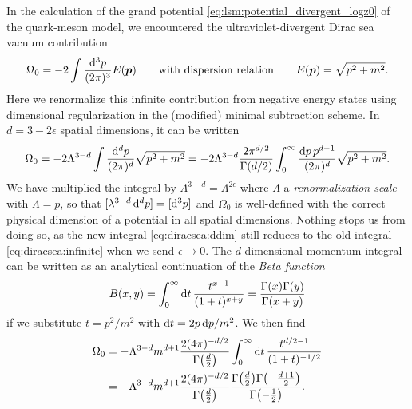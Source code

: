 In the calculation of the grand potential \eqref{eq:lsm:potential_divergent_logz0} of the quark-meson model,
we encountered the ultraviolet-divergent Dirac sea vacuum contribution %
\begin{equation}
	\Omega_0 = -2 \int \frac{\mathop{}\!\mathrm{d}^3 p}{(2 \pi)^3} E({\bm{p}})
	\qquad \text{with dispersion relation} \qquad
	E({\bm{p}}) = \sqrt{p^2+m^2} .
\label{eq:diracsea:infinite}
\end{equation}
Here we renormalize this infinite contribution from negative energy states using dimensional regularization in the (modified) minimal subtraction scheme.
In $d = 3 - 2 \epsilon$ spatial dimensions, it can be written
\begin{equation}
	\Omega_0 = -2 \Lambda^{3-d} \int \frac{\mathop{}\!\mathrm{d}^d p}{(2 \pi)^d} \sqrt{p^2 + m^2}
	         = -2 \Lambda^{3-d} \frac{2 \pi^{d/2}}{\Gamma(d/2)} \int_0^\infty \frac{\mathop{}\!\mathrm{d} p \, p^{d-1}}{(2 \pi)^d} \sqrt{p^2 + m^2} .
\label{eq:diracsea:ddim}
\end{equation}
We have multiplied the integral by $\Lambda^{3-d} = \Lambda^{2\epsilon}$ where $\Lambda$ a \emph{renormalization scale} with $\unit{\Lambda} = \unit{p}$,
so that $[\lambda^{3-d} \mathop{}\!\mathrm{d}^d p] = [\mathop{}\!\mathrm{d}^3 p]$ and $\Omega_0$ is well-defined with the correct physical dimension of a potential in all spatial dimensions.
Nothing stops us from doing so,
as the new integral \eqref{eq:diracsea:ddim} still reduces to the old integral \eqref{eq:diracsea:infinite} when we send $\epsilon \rightarrow 0$.
The $d$-dimensional momentum integral can be written as an analytical continuation of the \emph{Beta function} \cite{ref:beta_function}
\begin{equation}
	B(x,y) = \int_0^\infty \mathop{}\!\mathrm{d} t \, \frac{t^{x-1}}{(1+t)^{x+y}} = \frac{\Gamma(x) \Gamma(y)}{\Gamma(x+y)}
\end{equation}
if we substitute $t = p^2/m^2$ with $\mathop{}\!\mathrm{d} t = 2 p \mathop{}\!\mathrm{d} p / m^2$.
We then find
\begin{equation}
\begin{split}
	\Omega_0 &= -\Lambda^{3-d} m^{d+1} \frac{2 (4 \pi)^{-d/2}}{\Gamma\big(\frac{d}{2}\big)} \int_0^\infty \mathop{}\!\mathrm{d} t \, \frac{t^{d/2-1}}{(1+t)^{-1/2}} \\
	         &= -\Lambda^{3-d} m^{d+1} \frac{2 (4 \pi)^{-d/2}}{\Gamma\big(\frac{d}{2}\big)} \frac{\Gamma\big(\frac{d}{2}\big) \Gamma\big( \textstyle{-\frac{d+1}{2}} \big)}{\Gamma\big( \textstyle{-\frac{1}{2}} \big)} .
\end{split}
\end{equation}
